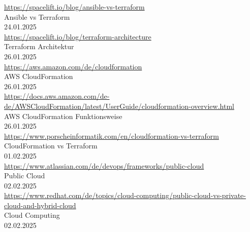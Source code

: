 \begin{thebibliography}{999}
     \href{https://spacelift.io/blog/ansible-vs-terraform}{https://spacelift.io/blog/ansible-vs-terraform} \\
     Ansible vs Terraform \\
     24.01.2025 \\

     \href{https://spacelift.io/blog/terraform-architecture}{https://spacelift.io/blog/terraform-architecture} \\
     Terraform Architektur \\
     26.01.2025 \\

     \href{https://aws.amazon.com/de/cloudformation}{https://aws.amazon.com/de/cloudformation} \\
     AWS CloudFormation \\
     26.01.2025 \\

     \href{https://docs.aws.amazon.com/de_de/AWSCloudFormation/latest/UserGuide/cloudformation-overview.html}{https://docs.aws.amazon.com/de-de/AWSCloudFormation/latest/UserGuide/cloudformation-overview.html} \\
     AWS CloudFormation Funktionsweise \\
     26.01.2025 \\

     \href{https://www.porscheinformatik.com/en/cloudformation-vs-terraform}{https://www.porscheinformatik.com/en/cloudformation-vs-terraform} \\
     CloudFormation vs Terraform \\
     01.02.2025 \\

     \href{https://www.atlassian.com/de/devops/frameworks/public-cloud}{https://www.atlassian.com/de/devops/frameworks/public-cloud} \\
     Public Cloud \\
     02.02.2025 \\

     \href{https://www.redhat.com/de/topics/cloud-computing/public-cloud-vs-private-cloud-and-hybrid-cloud}{https://www.redhat.com/de/topics/cloud-computing/public-cloud-vs-private-cloud-and-hybrid-cloud} \\
     Cloud Computing \\
     02.02.2025 \\


\end{thebibliography}
